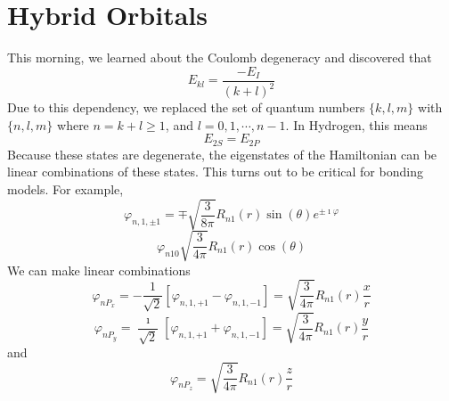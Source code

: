\documentclass[a4paper,twoside,master.tex]{subfiles}
\begin{document}

\section{Hybrid Orbitals}
\label{sec:hybrid_orbitals}

This morning, we learned about the Coulomb degeneracy and discovered that
\begin{equation}
    E_{kl} = \frac{-E_I}{(k+l)^2}
\end{equation}
Due to this dependency, we replaced the set of quantum numbers $ \{k,l,m\} $ with $ \{n,l,m\} $ where $ n = k + l \geq 1 $, and $ l = 0,1,\cdots,n-1 $. In Hydrogen, this means
\begin{equation}
    E_{2S} = E_{2P}
\end{equation}
Because these states are degenerate, the eigenstates of the Hamiltonian can be linear combinations of these states. This turns out to be critical for bonding models. For example,
\begin{equation}
    \varphi_{n,1,\pm1} = \mp \sqrt{\frac{3}{8 \pi}} R_{n1}(r) \sin(\theta) e^{\pm \imath \varphi}
\end{equation}
\begin{equation}
    \varphi_{n10} \sqrt{\frac{3}{4 \pi}} R_{n1}(r) \cos(\theta)
\end{equation}
We can make linear combinations
\begin{equation}
    \varphi_{nP_x} = - \frac{1}{\sqrt{2}} \left[ \varphi_{n,1,+1} - \varphi_{n,1,-1} \right] = \sqrt{\frac{3}{4 \pi}} R_{n1}(r) \frac{x}{r}
\end{equation}
\begin{equation}
    \varphi_{nP_y} = \frac{\imath}{\sqrt{2}} \left[ \varphi_{n,1,+1} + \varphi_{n,1,-1} \right] = \sqrt{\frac{3}{4 \pi}} R_{n1}(r) \frac{y}{r}
\end{equation}
and
\begin{equation}
    \varphi_{nP_z} = \sqrt{\frac{3}{4 \pi}} R_{n1}(r) \frac{z}{r}
\end{equation}
\end{document}
